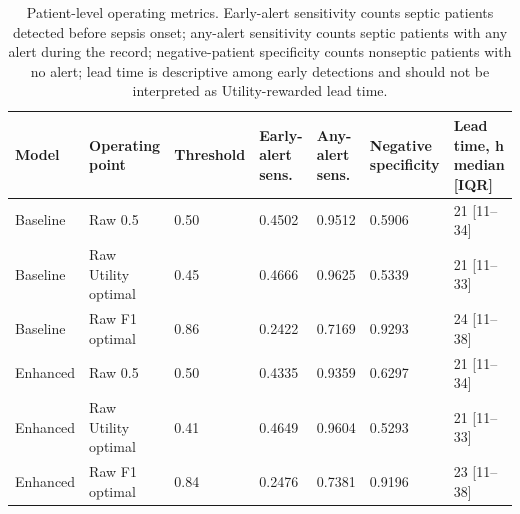 \begin{table}[!t]
\centering
\caption{Patient-level operating metrics. Early-alert sensitivity counts septic patients detected before sepsis onset; any-alert sensitivity counts septic patients with any alert during the record; negative-patient specificity counts nonseptic patients with no alert; lead time is descriptive among early detections and should not be interpreted as Utility-rewarded lead time.}
\label{tab:phase8_patient_level_metrics}
\scriptsize
\renewcommand{\arraystretch}{1.12}
\begin{tabular*}{\textwidth}{@{\extracolsep{\fill}}lllllll}
\toprule
\textbf{Model} & \textbf{Operating point} & \textbf{Threshold} & \textbf{Early-alert sens.} & \textbf{Any-alert sens.} & \textbf{Negative specificity} & \textbf{Lead time, h median [IQR]} \\
\midrule
Baseline & Raw 0.5 & 0.50 & 0.4502 & 0.9512 & 0.5906 & 21 [11--34] \\
Baseline & Raw Utility optimal & 0.45 & 0.4666 & 0.9625 & 0.5339 & 21 [11--33] \\
Baseline & Raw F1 optimal & 0.86 & 0.2422 & 0.7169 & 0.9293 & 24 [11--38] \\
Enhanced & Raw 0.5 & 0.50 & 0.4335 & 0.9359 & 0.6297 & 21 [11--34] \\
Enhanced & Raw Utility optimal & 0.41 & 0.4649 & 0.9604 & 0.5293 & 21 [11--33] \\
Enhanced & Raw F1 optimal & 0.84 & 0.2476 & 0.7381 & 0.9196 & 23 [11--38] \\
\bottomrule
\end{tabular*}
\end{table}
